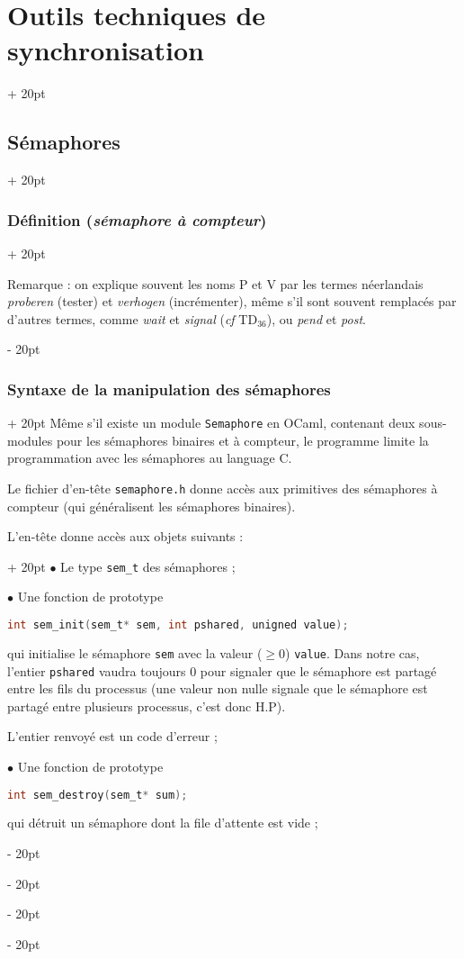 \documentclass[a4paper, 12pt, twoside]{article}
\renewcommand{\ge}{\geqslant}
\newcommand{\ind}[1][20pt]{\advance\leftskip + #1}
\newcommand{\deind}[1][20pt]{\advance\leftskip - #1}
\newenvironment{indt}[2][20pt]{#2 \par \ind[#1]}{\par \deind} %
\begin{document}
\begin{indt}{\section{Outils techniques de synchronisation}}
\begin{indt}{\subsection{Sémaphores}}
\begin{indt}{\subsubsection{Définition (\emph{sémaphore à compteur})}}
                \vspace{12pt}
                
                Remarque : on explique souvent les noms P et V par les termes néerlandais \textit{proberen} (tester) et \textit{verhogen} (incrémenter), même s'il sont souvent remplacés par d'autres termes, comme \textit{wait} et \textit{signal} (\textit{cf} TD$_{36}$), ou \textit{pend} et \textit{post}.
            \end{indt}

            \vspace{12pt}
            
            \begin{indt}{\subsubsection{Syntaxe de la manipulation  des sémaphores}}
                Même s'il existe un module \texttt{Semaphore} en OCaml, contenant deux sous-modules pour les sémaphores binaires et à compteur, le programme limite la programmation avec les sémaphores au language C.

                Le fichier d'en-tête \texttt{semaphore.h} donne accès aux primitives des sémaphores à compteur (qui généralisent les sémaphores binaires).

                \vspace{12pt}
                
                \begin{indt}{L'en-tête donne accès aux objets suivants :}
                    $\bullet$ Le type \texttt{sem\_t} des sémaphores ;

                    $\bullet$ Une fonction de prototype
                    \begin{lstlisting}[language=C, xleftmargin=100pt]
int sem_init(sem_t* sem, int pshared, unigned value);\end{lstlisting}

                    qui initialise le sémaphore \texttt{sem} avec la valeur ($\ge 0$) \texttt{value}.
                    Dans notre cas, l'entier \texttt{pshared} vaudra toujours 0 pour signaler que le sémaphore est partagé entre les fils du processus (une valeur non nulle signale que le sémaphore est partagé entre plusieurs processus, c'est donc H.P).

                    L'entier renvoyé est un code d'erreur ;

                    $\bullet$ Une fonction de prototype
                    \begin{lstlisting}[language=C, xleftmargin=100pt]
int sem_destroy(sem_t* sum);\end{lstlisting}
                    qui détruit un sémaphore dont la file d'attente est vide ;


\end{indt}
\end{indt}
\end{indt}
\end{indt}
\end{document}
